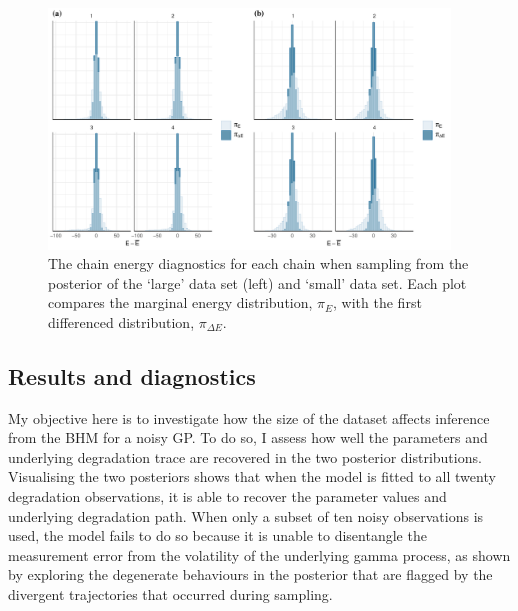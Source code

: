 \begin{figure}
  \centering
  \includegraphics[width=0.95\textwidth]{./figures/ch-4/nuts_energy.pdf}
  \caption{The chain energy diagnostics for each chain when sampling from the posterior of the `large' data set (left) and `small' data set. Each plot compares the marginal energy distribution, $\pi_E$, with the first differenced distribution, $\pi_{\Delta E}$.}
  \label{fig:nuts-energies}
\end{figure}

\subsection{Results and diagnostics} \label{sec:noisy-GP-results}

My objective here is to investigate how the size of the dataset affects inference from the BHM for a noisy GP. To do so, I assess how well the parameters and underlying degradation trace are recovered in the two posterior distributions. Visualising the two posteriors shows that when the model is fitted to all twenty degradation observations, it is able to recover the parameter values and underlying degradation path. When only a subset of ten noisy observations is used, the model fails to do so because it is unable to disentangle the measurement error from the volatility of the underlying gamma process, as shown by exploring the degenerate behaviours in the posterior that are flagged by the divergent trajectories that occurred during sampling. 

